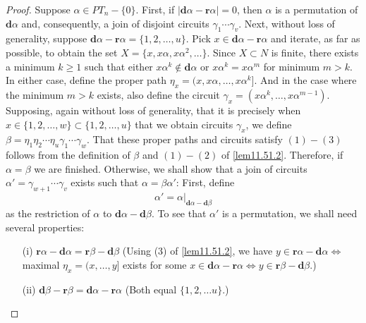 \documentclass{surv-l}
\numberwithin{equation}{section}
\numberwithin{table}{section}
\numberwithin{figure}{section}
\theoremstyle{definition}
\begin{document}
\begin{proof}Suppose $\alpha\in PT_{n}-\{0\}$. First, if
$|\mathbf{d}\alpha-\mathbf{r}\alpha|=0$, then $\alpha$ is a
permutation of $\mathbf{d}\alpha$ and, consequently, a join of
disjoint circuits $\gamma_{1}\cdots\gamma_{v}$. Next, without loss
of generality, suppose
$\mathbf{d}\alpha-\mathbf{r}\alpha=\{1,2,\ldots, u\}$. Pick $ x\in
\mathbf{d}\alpha-\mathbf{r}\alpha$ and iterate, as far as
possible, to obtain the set $X=\{x, x\alpha,x\alpha^{2},
\ldots\}$. Since $X\subset N$ is finite, there exists a minimum
$k\geq 1$ such that either $ x\alpha^{k}\not\in \mathbf{d}\alpha$
or $x\alpha^{k}=x\alpha^{m}$ for minimum $m>k$. In either case,
define the proper path $\eta_{x}=(x,  x\alpha,\ldots,
x\alpha^{k}]$. And in the case where the minimum $m>k$ exists,
also define the circuit $\gamma_{x}= (x\alpha^{k},\ldots,
x\alpha^{m-1})$. Supposing, again without loss of generality, that
it is precisely when $x\in\{1,2,\ldots, w\}\subset\{1,2,\ldots,
u\}$ that we obtain circuits $\gamma_{x}$, we define
$\beta=\eta_{1}\eta_{2}\cdots\eta_{u}\gamma_{1}\cdots\gamma_{w}$.
That these proper paths and circuits satisfy $(1)-(3)$ follows
from the definition of $\beta$ and $(1)-(2)$ of \ref{lem11.51.2}.
Therefore, if $\alpha=\beta$ we are finished. Otherwise, we shall
show that a join of circuits
$\alpha'=\gamma_{w+1}\cdots\gamma_{v}$ exists such that
$\alpha=\beta\alpha'$: First, define
\[
\alpha'=\alpha|_{\mathbf{d}\alpha-\mathbf{d}\beta}
\]
as the restriction of $\alpha$ to
$\mathbf{d}\alpha-\mathbf{d}\beta$. To see that $\alpha'$ is a
permutation, we shall need several properties:
\begin{enumerate}
\item[(i)] $\mathbf{r}\alpha-\mathbf{d}\alpha=\mathbf{r}\beta-\mathbf{d}\beta$\quad
(Using (3) of \ref{lem11.51.2}, we have $y\in
\mathbf{r}\alpha-\mathbf{d}\alpha\Leftrightarrow$ maximal
$\eta_{x}=(x,\ldots, y]$ exists for some $x\in
\mathbf{d}\alpha-\mathbf{r}\alpha\Leftrightarrow y\in
\mathbf{r}\beta-\mathbf{d}\beta.$)

\item[(ii)] $\mathbf{d}\beta-\mathbf{r}\beta=\mathbf{d}\alpha-\mathbf{r}\alpha$\quad
(Both equal $\{1, 2, \ldots u\}.$)


\end{enumerate}
\end{proof}
\end{document}
